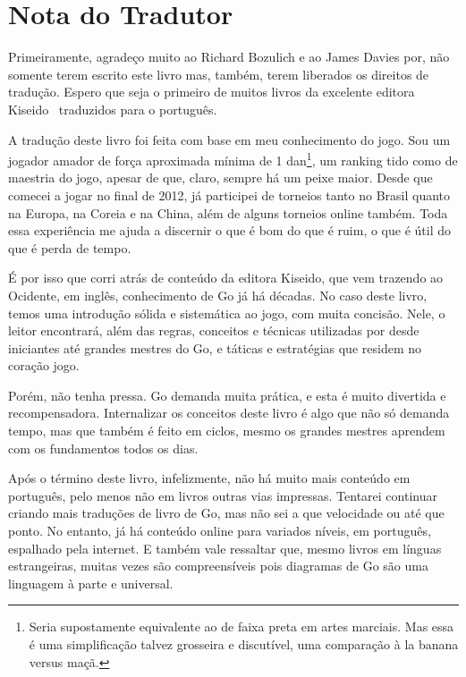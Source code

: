 \chapter{Nota do Tradutor}

Primeiramente, agradeço muito ao Richard Bozulich e ao James Davies por, não somente terem escrito este livro mas, também, terem liberados os direitos de tradução. Espero que seja o primeiro de muitos livros da excelente editora Kiseido~\cite{kiseido} traduzidos para o português.

\bigskip

A tradução deste livro foi feita com base em meu conhecimento do jogo. Sou um jogador amador de força aproximada mínima de 1 dan\footnote{Seria supostamente equivalente ao de faixa preta em artes marciais. Mas essa é uma simplificação talvez grosseira e discutível, uma comparação à la banana versus maçã.}, um ranking tido como de maestria do jogo, apesar de que, claro, sempre há um peixe maior. Desde que comecei a jogar no final de 2012, já participei de torneios tanto no Brasil quanto na Europa, na Coreia e na China, além de alguns torneios online também. Toda essa experiência me ajuda a discernir o que é bom do que é ruim, o que é útil do que é perda de tempo.

É por isso que corri atrás de conteúdo da editora Kiseido, que vem trazendo ao Ocidente, em inglês, conhecimento de Go já há décadas. No caso deste livro, temos uma introdução sólida e sistemática ao jogo, com muita concisão. Nele, o leitor encontrará, além das regras, conceitos e técnicas utilizadas por desde iniciantes até grandes mestres do Go, e táticas e estratégias que residem no coração jogo.

Porém, não tenha pressa. Go demanda muita prática, e esta é muito divertida e recompensadora. Internalizar os conceitos deste livro é algo que não só demanda tempo, mas que também é feito em ciclos, mesmo os grandes mestres aprendem com os fundamentos todos os dias.

\pagebreak

Após o término deste livro, infelizmente, não há muito mais conteúdo em português, pelo menos não em livros outras vias impressas. Tentarei continuar criando mais traduções de livro de Go, mas não sei a que velocidade ou até que ponto. No entanto, já há conteúdo online para variados níveis, em português, espalhado pela internet. E também vale ressaltar que, mesmo livros em línguas estrangeiras, muitas vezes são compreensíveis pois diagramas de Go são uma linguagem à parte e universal.

